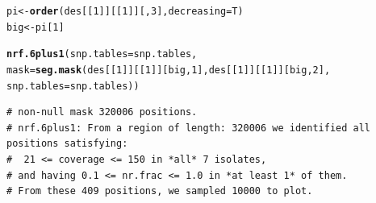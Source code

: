 \documentclass{article}\usepackage[]{graphicx}\usepackage[]{color}
\makeatletter
\newcommand{\hlnum}[1]{\textcolor[rgb]{0.686,0.059,0.569}{#1}}%
\newcommand{\hlstd}[1]{\textcolor[rgb]{0.345,0.345,0.345}{#1}}%
\newcommand{\hlkwb}[1]{\textcolor[rgb]{0.69,0.353,0.396}{#1}}%
\newcommand{\hlkwc}[1]{\textcolor[rgb]{0.333,0.667,0.333}{#1}}%
\newcommand{\hlkwd}[1]{\textcolor[rgb]{0.737,0.353,0.396}{\textbf{#1}}}%
\newenvironment{kframe}{%
 \def\at@end@of@kframe{}%
 \ifinner\ifhmode%
  \def\at@end@of@kframe{\end{minipage}}%
  \begin{minipage}{\columnwidth}%
 \fi\fi%
 \def\FrameCommand##1{\hskip\@totalleftmargin \hskip-\fboxsep
 \colorbox{shadecolor}{##1}\hskip-\fboxsep
     \hskip-\linewidth \hskip-\@totalleftmargin \hskip\columnwidth}%
 \MakeFramed {\advance\hsize-\width
   \@totalleftmargin\z@ \linewidth\hsize
   \@setminipage}}%
 {\par\unskip\endMakeFramed%
 \at@end@of@kframe}
\newenvironment{knitrout}{}{} %
\makeatother
\begin{document}
\begin{knitrout}\footnotesize
{}\color{fgcolor}\begin{kframe}
\begin{alltt}
\hlstd{pi} \hlkwb{<-} \hlkwd{order}\hlstd{(des[[}\hlnum{1}\hlstd{]][[}\hlnum{1}\hlstd{]][,}\hlnum{3}\hlstd{],}\hlkwc{decreasing}\hlstd{=T)}
\hlstd{big} \hlkwb{<-} \hlstd{pi[}\hlnum{1}\hlstd{]}

\hlkwd{nrf.6plus1}\hlstd{(}\hlkwc{snp.tables}\hlstd{=snp.tables,}
           \hlkwc{mask}\hlstd{=}\hlkwd{seg.mask}\hlstd{(des[[}\hlnum{1}\hlstd{]][[}\hlnum{1}\hlstd{]][big,}\hlnum{1}\hlstd{],des[[}\hlnum{1}\hlstd{]][[}\hlnum{1}\hlstd{]][big,}\hlnum{2}\hlstd{],}
                         \hlkwc{snp.tables}\hlstd{=snp.tables))}
\end{alltt}
\begin{verbatim}
# non-null mask 320006 positions.
# nrf.6plus1: From a region of length: 320006 we identified all positions satisfying: 
#  21 <= coverage <= 150 in *all* 7 isolates, 
# and having 0.1 <= nr.frac <= 1.0 in *at least 1* of them. 
# From these 409 positions, we sampled 10000 to plot.
\end{verbatim}
\end{kframe}\begin{figure}

\end{figure}
\end{knitrout}
\end{document}
